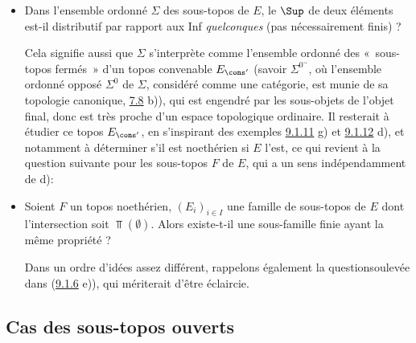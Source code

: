 \documentclass[10pt]{../fichiers-configuration-latex/smfart}
\begin{document}
\begin{itemize}
Cet énoncé a un sens, grâce au résultat de \textsc{Deligne} (voir [16] proposition 4.47)
affirmant l'existence des 2-produits-fibrés de topos. Voir cependant
l'exemple \hyperref[IV.exer9.1.7.2]{9.1.7.2} d).

D'autre part, on voit par \hyperref[IV.exer9.1.11]{9.1.11} h) qu'une réponse
affirmative à b) fournirait dans le cas localement noethérien une
réponse affirmative à la question suivante:

\item[d)] Dans l'ensemble ordonné $\Sigma$ des sous-topos de $E$, le
$\Sup$ de deux éléments est-il distributif par rapport aux Inf
\emph{quelconques} (pas nécessairement finis) ?

Cela signifie aussi que $\Sigma$ s'interprète comme l'ensemble
ordonné des « sous-topos fermés »  d'un topos convenable
$E_{\cons'}$ (savoir $\Sigma^{0^{\sim}}$, où l'ensemble ordonné
opposé $\Sigma^0$ de $\Sigma$, considéré comme une
catégorie, est
munie de sa topologie canonique, \cf \hyperref[IV.exer7.8]{7.8} b)), qui est
engendré par les sous-objets de l'objet final, donc est très proche
d'un espace topologique ordinaire. Il resterait à étudier ce topos
$E_{\cons'}$, en s'inspirant des exemples \hyperref[IV.exer9.1.11]{9.1.11} g) et
\hyperref[IV.exer9.1.12]{9.1.12} d), et notamment à déterminer s'il est
noethérien si $E$ l'est, ce qui revient à la question suivante pour
les sous-topos $F$ de $E$, qui a un sens indépendamment de d):

\item[e)] Soient $F$ un topos noethérien, $(E_i)_{i\in I}$ une famille
de sous-topos de $E$ dont l'intersection soit $\Top(∅)$. Alors
existe-t-il une sous-famille finie ayant la même propriété ?

Dans un ordre d'idées assez différent, rappelons également la
question\pageoriginale soulevée dans (\hyperref[IV.exer9.1.6]{9.1.6} e)), qui
mériterait d'être éclaircie.
\end{itemize}

\subsection{Cas des sous-topos ouverts}

\subsubsection{}
\end{document}
